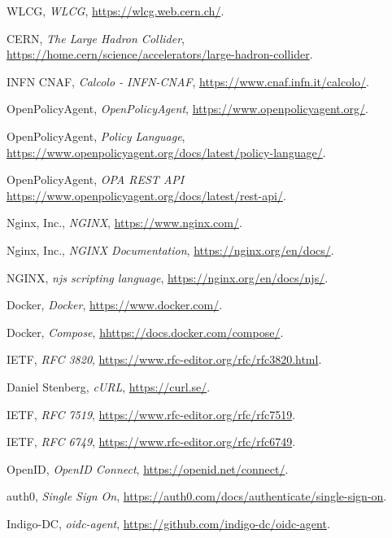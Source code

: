 \begin{thebibliography}{99}
	
	WLCG, 
	\textit{WLCG},
	\url{https://wlcg.web.cern.ch/}.
	
	CERN, 
	\textit{The Large Hadron Collider},
	\url{https://home.cern/science/accelerators/large-hadron-collider}.
	
	INFN CNAF,
	\textit{Calcolo - INFN-CNAF},
	\url{https://www.cnaf.infn.it/calcolo/}.
	
	OpenPolicyAgent,
	\textit{OpenPolicyAgent},
	\url{https://www.openpolicyagent.org/}.

	OpenPolicyAgent,
	\textit{Policy Language},
	\url{https://www.openpolicyagent.org/docs/latest/policy-language/}.
	
	OpenPolicyAgent, \textit{OPA REST API}
	\url{https://www.openpolicyagent.org/docs/latest/rest-api/}.
	
	Nginx, Inc.,
	\textit{NGINX},
	\url{https://www.nginx.com/}.
	
	Nginx, Inc.,
	\textit{NGINX Documentation},
	\url{https://nginx.org/en/docs/}.

	NGINX,
	\textit{njs scripting language},
	\url{https://nginx.org/en/docs/njs/}.
	
	Docker,
	\textit{Docker},
	\url{https://www.docker.com/}.
	
	Docker,
	\textit{Compose},
	\url{hhttps://docs.docker.com/compose/}.

	IETF,
	\textit{RFC 3820},
	\url{https://www.rfc-editor.org/rfc/rfc3820.html}.
	
	Daniel Stenberg, \textit{cURL}, 
	\url{https://curl.se/}.
	
	IETF,
	\textit{RFC 7519},
	\url{https://www.rfc-editor.org/rfc/rfc7519}.

	IETF, 
	\textit{RFC 6749},
	\url{https://www.rfc-editor.org/rfc/rfc6749}.
	
	OpenID, 
	\textit{OpenID Connect},
	\url{https://openid.net/connect/}.
	
	auth0, \textit{Single Sign On},
	\url{https://auth0.com/docs/authenticate/single-sign-on}.
	
	Indigo-DC, \textit{oidc-agent}, 
	\url{https://github.com/indigo-dc/oidc-agent}.
	

\end{thebibliography}
